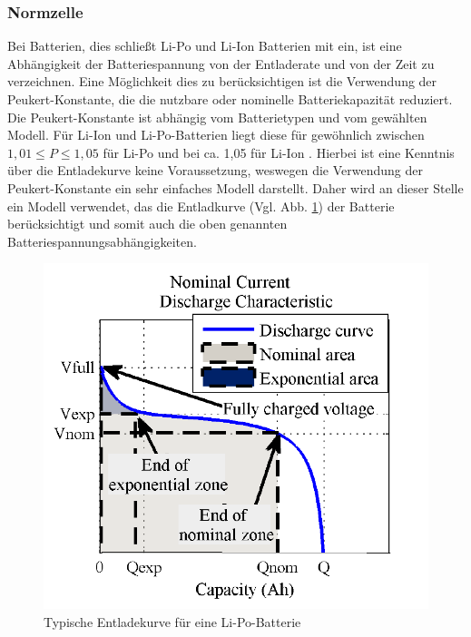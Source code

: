 \subsubsection{Normzelle}
Bei Batterien, dies schließt Li-Po und Li-Ion Batterien mit ein, ist eine Abhängigkeit der Batteriespannung von der Entladerate und von der Zeit zu verzeichnen. Eine Möglichkeit dies zu berücksichtigen ist die Verwendung der Peukert-Konstante, die die nutzbare oder nominelle Batteriekapazität reduziert. Die Peukert-Konstante ist abhängig vom Batterietypen und vom gewählten Modell. Für Li-Ion und Li-Po-Batterien liegt diese für gewöhnlich zwischen $1,01 \leq P \leq 1,05$ für Li-Po und bei ca. 1,05 für Li-Ion \cite{Traub.2016}. Hierbei ist eine Kenntnis über die Entladekurve keine Voraussetzung, weswegen die Verwendung der Peukert-Konstante ein sehr einfaches Modell darstellt. 
Daher wird an dieser Stelle ein Modell verwendet, das die Entladkurve (Vgl. Abb. \ref{abb:discharge_curve}) der Batterie berücksichtigt \cite{Tremblay.2009} und somit auch die oben genannten Batteriespannungsabhängigkeiten.  
\begin{figure}[H]
	\centering
	\includegraphics[scale=0.5]{images/Discharge.PNG}
	\caption{Typische Entladekurve für eine Li-Po-Batterie \cite{Tremblay.2009}}
	\label{abb:discharge_curve}
\end{figure}

